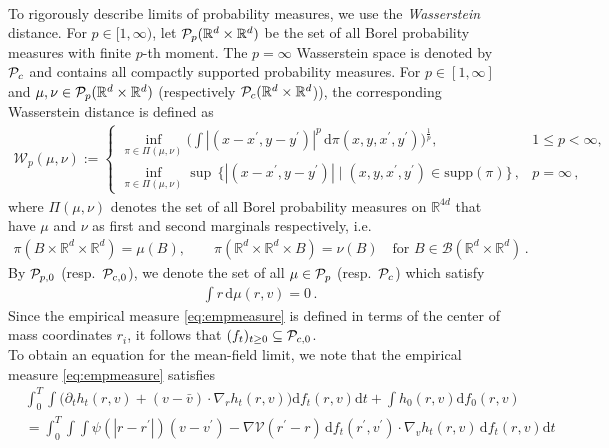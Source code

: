 \documentclass[11pt]{article}
\newcommand{\R}[0]{\mathbb R}
\newcommand{\V}[0]{\mathcal V}
\newcommand{\abs}[1]{\left| #1 \right|}
\newcommand{\Ppo}[1]{
    \ifx #1\infty
        \mathcal{P}_{c,0}
    \else 
        \mathcal{P}_{#1,0}
    \fi 
}
\newcommand{\Pp}[1]{
    \ifx #1\infty
        \mathcal{P}_{c}
    \else 
        \mathcal{P}_{#1}
    \fi 
}
\newcommand{\Wpdist}{\mathcal{W}}
\newcommand{\supp}{\mathrm{supp}}
\newcommand{\msolinit}[1]{f_0(#1)}
\newcommand{\msolt}[2]{f_{#1}(#2)}
\begin{document}
\begin{bibunit}[unsrtnat]
\begin{align}
    \end{align}
    To rigorously describe limits of probability measures, we use the \textit{Wasserstein} distance. For $p \in [1,\infty)$, let $\Pp{p}(\R^d \times \R^d)$ be the set of all Borel probability measures with finite $p$-th moment. The $p = \infty$ Wasserstein space is denoted by $\Pp{\infty}$ and contains all compactly supported probability measures. For $p \in [1,\infty]$ and $\mu,\nu\in \Pp{p}(\R^d \times \R^d )$ (respectively $\Pp{\infty} (\R^d \times \R^d$)), the corresponding Wasserstein distance is defined as
    \begin{align*}
        \Wpdist_p (\mu, \nu) := 
        \begin{cases}
            \inf\limits_{\pi \in \Pi(\mu, \nu)}  \Big( \displaystyle \int \abs{(x - x^\prime, y - y^\prime) }^p \, \mathrm{d} \pi(x,y,x^\prime, y^\prime) \Big)^{\frac{1}{p} }   , &1 \leq p < \infty, \\
            \inf\limits_{\pi \in \Pi(\mu, \nu)} \sup \,  \{ \abs{(x-x^\prime, y-y^\prime)} \mid (x,y,x^\prime,y^\prime) \in \supp(\pi) \} \, , &p = \infty \, ,
        \end{cases}
    \end{align*}
    where $\Pi(\mu,\nu)$ denotes the set of all Borel probability measures on $ \R^{4d}$ that have $\mu$ and $\nu$ as first and second marginals respectively, i.e.\    
    \begin{align*}
        \pi(B \times \R^d \times \R^d ) = \mu(B), \qquad \pi(\R^d \times \R^d \times B) = \nu(B) \quad \text{for } B \in \mathcal{B}(\R^{d} \times \R^d ) \, .
     \end{align*}
    By $\Ppo{p}$ (resp.\ $\Ppo{\infty}$), we denote the set of all $\mu \in \Pp{p}$ (resp.\ $\Pp{\infty}$) which satisfy 
    \begin{align*}
        \int r \, \mathrm{d} \mu(r,v) = 0 \, .
    \end{align*}
    Since the empirical measure \eqref{eq:empmeasure} is defined in terms of the center of mass coordinates $r_i$, it follows that $(f_t)_{t \geq 0} \subseteq \Ppo{\infty}$. \\
    To obtain an equation for the mean-field limit, we note that the empirical measure \eqref{eq:empmeasure} satisfies
    \begin{align}
        &\int_0^T \int \big( \partial_t h_t(r,v)  + (v-\bar{v}) \cdot\nabla_r h_t(r,v) \big)\mathrm{d} \msolt{t}{r,v} \mathrm{d} t + \int h_0(r,v)\mathrm{d} \msolinit{r,v} \nonumber \\
	&= \int_0^T \int \int\psi(| r -  r^\prime |)(v - v^\prime) - \nabla \V(r^\prime - r) \, \mathrm{d} \msolt{t}{r^\prime,v^\prime} \cdot \nabla_v h_t(r,v) \, \mathrm{d} \msolt{t}{r,v} \mathrm{d} t \label{eq:weakform}

\end{align}
\end{bibunit}
\end{document}

